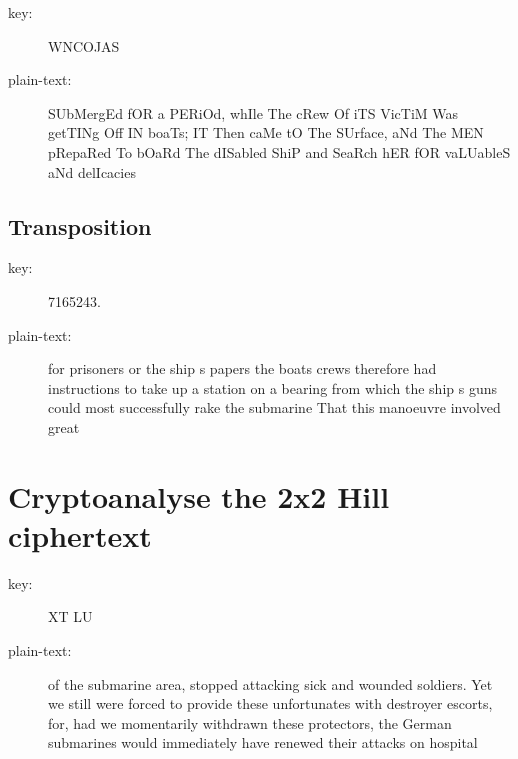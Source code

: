 \documentclass[a4paper]{article}
\begin{document}
        \begin{description}
            \item[key:] WNCOJAS
            \item[plain-text:] SUbMergEd fOR a PERiOd, whIle The cRew Of iTS VicTiM Was getTINg
                Off IN boaTs; IT Then caMe tO The SUrface, aNd The MEN pRepaRed To bOaRd The
                dISabled ShiP and SeaRch hER fOR vaLUableS aNd delIcacies
        \end{description}

    \subsection{Transposition}
        \begin{description}
            \item[key:] 7165243.
            \item[plain-text:] for prisoners or the ship s papers  the boats  crews  therefore
                had instructions to take up a station on a bearing from which the ship s guns
                could most successfully rake the submarine  That this manoeuvre involved great
        \end{description}

\section{Cryptoanalyse the 2x2 Hill ciphertext}
    \begin{description}
        \item[key:] XT LU
        \item[plain-text:] of the submarine area, stopped attacking sick and wounded soldiers.
            Yet we still were forced to provide these unfortunates with destroyer escorts, for,
            had we momentarily withdrawn these protectors, the German submarines would
            immediately have renewed their attacks on hospital 
    \end{description}
\end{document}

